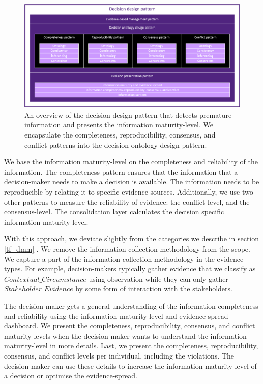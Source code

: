 \begin{figure}[H]
\centering
  \includegraphics[width=17cm]{../../Images/04_Contribution/Pattern_Architecture.png}
  \caption{An overview of the decision design pattern that detects premature information and presents the information maturity-level. We encapsulate the completeness, reproducibility, consensus, and conflict patterns into the decision ontology design pattern.}
  \label{fig:contribution_architecture}
\end{figure}

We base the information maturity-level on the completeness and reliability of the information. The completeness pattern ensures that the information that a decision-maker needs to make a decision is available. The information needs to be reproducible by relating it to specific evidence sources. Additionally, we use two other patterns to measure the reliability of evidence: the conflict-level, and the consensus-level. The consolidation layer calculates the decision specific information maturity-level. 

With this approach, we deviate slightly from the categories we describe in section \ref{tf_dmm} . We remove the information collection methodology from the scope. We capture a part of the information collection methodology in the evidence types. For example, decision-makers typically gather evidence that we classify as $Contextual\_Circumstance$ using observation while they can only gather $Stakeholder\_Evidence$ by some form of interaction with the stakeholders. 

The decision-maker gets a general understanding of the information completeness and reliability using the information maturity-level and evidence-spread dashboard. We present the completeness, reproducibility, consensus, and conflict maturity-levels when the decision-maker wants to understand the information maturity-level in more details. Last, we present the completeness, reproducibility, consensus, and conflict levels per individual, including the violations. The decision-maker can use these details to increase the information maturity-level of a decision or optimise the evidence-spread. 

